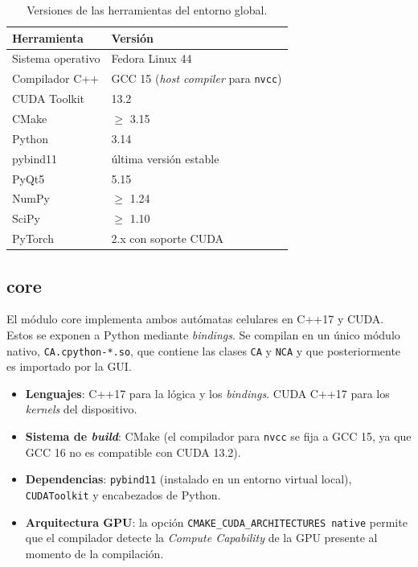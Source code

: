 \begin{table}[H]
    \centering
    \begin{tabular}{l|l}
        \hline
        \textbf{Herramienta} & \textbf{Versión} \\ \hline
        Sistema operativo & Fedora Linux 44 \\ \hline
        Compilador C++ & GCC 15 (\textit{host compiler} para \texttt{nvcc}) \\ \hline
        CUDA Toolkit & 13.2 \\ \hline
        CMake & $\geq$ 3.15 \\ \hline
        Python & 3.14 \\ \hline
        pybind11 & última versión estable \\ \hline
        PyQt5 & 5.15 \\ \hline
        NumPy & $\geq$ 1.24 \\ \hline
        SciPy & $\geq$ 1.10 \\ \hline
        PyTorch & 2.x con soporte CUDA \\ \hline
    \end{tabular}
    \caption{Versiones de las herramientas del entorno global.}
    \label{table:entorno_global}
\end{table}

\subsection{core}

El módulo core implementa ambos autómatas celulares en C++17 y CUDA. Estos se exponen a Python mediante \textit{bindings}. Se compilan en un único módulo nativo, \texttt{CA.cpython-*.so}, que contiene las clases \texttt{CA} y \texttt{NCA} y que posteriormente es importado por la GUI.

\begin{itemize}
    \item \textbf{Lenguajes}: C++17 para la lógica y los \textit{bindings}. CUDA C++17 para los \textit{kernels} del dispositivo.
    \item \textbf{Sistema de \textit{build}}: CMake (el compilador para \texttt{nvcc} se fija a GCC 15, ya que GCC 16 no es compatible con CUDA 13.2).
    \item \textbf{Dependencias}: \texttt{pybind11} (instalado en un entorno virtual local), \texttt{CUDAToolkit} y encabezados de Python.
    \item \textbf{Arquitectura GPU}: la opción \texttt{CMAKE\_CUDA\_ARCHITECTURES native} permite que el compilador detecte la \textit{Compute Capability} de la GPU presente al momento de la compilación.
\end{itemize}

